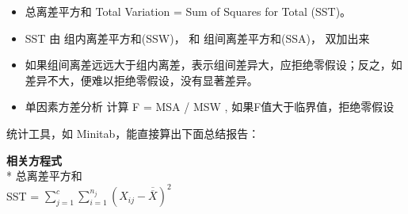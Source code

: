 \begin{description}
\begin{description}
\begin{itemize}
\tightlist
\item
  总离差平方和 Total Variation = Sum of Squares for Total (SST)。
\end{itemize}

\begin{itemize}
\tightlist
\item
  SST 由 组内离差平方和(SSW)， 和 组间离差平方和(SSA)， 双加出来
\end{itemize}

\begin{itemize}
\tightlist
\item
  如果组间离差远远大于组内离差，表示组间差异大，应拒绝零假设；反之，如差异不大，便难以拒绝零假设，没有显著差异。
\end{itemize}

\begin{itemize}
\tightlist
\item
  单因素方差分析 计算 F = MSA / MSW , 如果F值大于临界值，拒绝零假设
\end{itemize}

统计工具，如 Minitab，能直接算出下面总结报告：\\





\textbf{相关方程式}\\
* 总离差平方和\\
SST =
\(\sum_{j=1}^c \sum_{i=1}^{n_j} (X_{ij} - \overline{\overline{X}})^2\)
\end{description}
\end{description}

\begin{description}
\item[]
\end{description}

